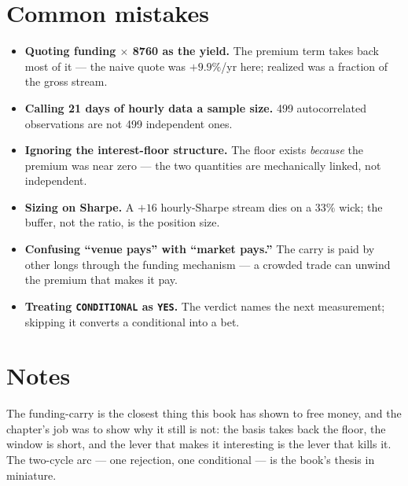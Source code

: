 \section{Common mistakes}
\begin{itemize}
\item \textbf{Quoting funding $\times$ 8760 as the yield.} The
premium term takes back most of it --- the naive quote was
$+9.9\%$/yr here; realized was a fraction of the gross stream.
\item \textbf{Calling 21 days of hourly data a sample size.}
499 autocorrelated observations are not 499 independent ones.
\item \textbf{Ignoring the interest-floor structure.} The floor
exists \emph{because} the premium was near zero --- the two
quantities are mechanically linked, not independent.
\item \textbf{Sizing on Sharpe.} A $+16$ hourly-Sharpe stream
dies on a $33\%$ wick; the buffer, not the ratio, is the
position size.
\item \textbf{Confusing ``venue pays'' with ``market pays.''}
The carry is paid by other longs through the funding
mechanism --- a crowded trade can unwind the premium that makes
it pay.
\item \textbf{Treating \texttt{CONDITIONAL} as \texttt{YES}.}
The verdict names the next measurement; skipping it converts a
conditional into a bet.
\end{itemize}

\section*{Notes}
The funding-carry is the closest thing this book has shown to
free money, and the chapter's job was to show why it still is
not: the basis takes back the floor, the window is short, and
the lever that makes it interesting is the lever that kills it.
The two-cycle arc --- one rejection, one conditional --- is the
book's thesis in miniature.

